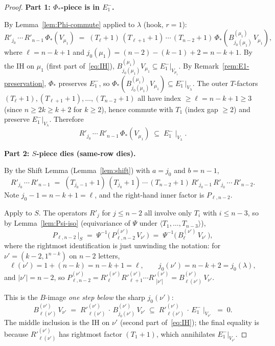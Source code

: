 \documentclass[11pt]{article}
\theoremstyle{definition}
\begin{document}
\begin{proof}
\medskip\noindent\textbf{Part 1: $\Phi_*$-piece is in $E_1^-$.}

By Lemma~\ref{lem:Phi-commute} applied to $\lambda$ (hook, $r = 1$):
\[
   R'_{j_0}\,\cdots\,R'_{n-1}\,\Phi_*(V_{\mu_1})
   \;=\;
   (T_\ell+1)\,(T_{\ell+1}+1)\,\cdots\,(T_{n-2}+1)\,
   \Phi_*\!\left(B^{(\mu_1)}_{j_0(\mu_1)}\,V_{\mu_1}\right),
\]
where $\ell = n - k + 1$ and $j_0(\mu_1) = (n-2) - (k-1) + 2 = n - k + 1$.
By the IH on $\mu_1$ (first part of~\eqref{eq:IH}),
$B^{(\mu_1)}_{j_0(\mu_1)} V_{\mu_1} \subseteq E_1^-|_{V_{\mu_1}}$.  By
Remark~\ref{rem:E1-preservation}, $\Phi_*$ preserves $E_1^-$, so
$\Phi_*(B^{(\mu_1)}_{j_0(\mu_1)} V_{\mu_1}) \subseteq E_1^-|_{V_\lambda}$.
The outer $T$-factors $(T_\ell+1), (T_{\ell+1}+1), \ldots, (T_{n-2}+1)$
all have index $\ge \ell = n - k + 1 \ge 3$ (since $n \ge 2k \ge k + 2$
for $k \ge 2$), hence commute with $T_1$ (index gap $\ge 2$) and
preserve $E_1^-|_{V_\lambda}$.  Therefore
\[
   R'_{j_0}\,\cdots\,R'_{n-1}\,\Phi_*(V_{\mu_1})
   \;\subseteq\; E_1^-\!\mid_{V_\lambda}.
\]

\medskip\noindent\textbf{Part 2: $S$-piece dies (same-row dies).}

By the Shift Lemma (Lemma~\ref{lem:shift}) with $a = j_0$ and $b = n - 1$,
\begin{equation}\label{eq:shift-app}
   R'_{j_0}\,\cdots\,R'_{n-1}
   \;=\;
   (T_{j_0 - 1}+1)\,(T_{j_0}+1)\,\cdots\,(T_{n-2}+1)\,
   R'_{j_0 - 1}\,R'_{j_0}\,\cdots\,R'_{n-2}.
\end{equation}
Note $j_0 - 1 = n - k + 1 = \ell$, and the right-hand inner factor is
$P_{\ell, n-2}$.

Apply to $S$.  The operators $R'_j$ for $j \le n - 2$ all involve only
$T_i$ with $i \le n - 3$, so by Lemma~\ref{lem:Psi-iso}
(equivariance of $\Psi$ under $\langle T_1, \ldots, T_{n-3}\rangle$),
\[
   P_{\ell, n-2}\,\big|_S
   \;=\; \Psi^{-1}\big(\,P^{(\nu')}_{\ell, n-2}\,V_{\nu'}\,\big)
   \;=\; \Psi^{-1}\big(\,B^{(\nu')}_\ell\,V_{\nu'}\,\big),
\]
where the rightmost identification is just unwinding the notation: for
$\nu' = (k-2, 1^{n-k})$ on $n - 2$ letters,
\[
   \ell(\nu') = 1 + (n - k) = n - k + 1 = \ell,
   \qquad
   j_0(\nu') = n - k + 2 = j_0(\lambda),
\]
and $|\nu'| = n - 2$, so
$P^{(\nu')}_{\ell, n-2} = R'^{(\nu')}_\ell R'^{(\nu')}_{\ell+1} \cdots R'^{(\nu')}_{|\nu'|}
= B^{(\nu')}_{\ell(\nu')}\,V_{\nu'}$.

This is the $B$-image \emph{one step below} the sharp $j_0(\nu')$:
\begin{equation}\label{eq:nu-killed}
   B^{(\nu')}_{\ell(\nu')}\,V_{\nu'}
   \;=\;
   R'^{(\nu')}_{\ell(\nu')}\,\cdot\,B^{(\nu')}_{j_0(\nu')}\,V_{\nu'}
   \;\subseteq\;
   R'^{(\nu')}_{\ell(\nu')}\,\cdot\,E_1^-\!\mid_{V_{\nu'}}
   \;=\; 0.
\end{equation}
The middle inclusion is the IH on $\nu'$ (second part of~\eqref{eq:IH});
the final equality is because $R'^{(\nu')}_{\ell(\nu')}$ has rightmost
factor $(T_1+1)$, which annihilates $E_1^-|_{V_{\nu'}}$.


\end{proof}
\end{document}
